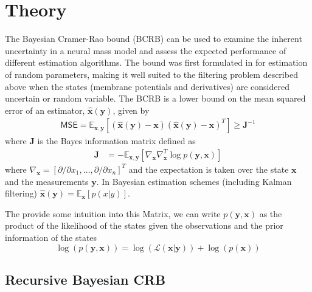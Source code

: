 \documentclass{article}
\renewcommand{\vec}[1]{\ensuremath{{\boldsymbol #1}}}
\newcommand{\mat}[1]{\ensuremath{\boldsymbol{#1}}}
\begin{document}
\section{Theory}

The Bayesian Cramer-Rao bound (BCRB) can be used to examine the inherent uncertainty in a neural mass model and assess the expected performance of different estimation algorithms. The bound was first formulated in \cite{VanTrees1968} for estimation of random parameters, making it well suited to the filtering problem described above when the states (membrane potentials and derivatives) are considered uncertain or random variable. The BCRB is a lower bound on the mean squared error of an estimator, $\hat{\vec x}(\vec y)$, given by
\begin{align}
	\mathsf{MSE} = \mathbb E_{\vec x,\vec y} [(\hat{\vec x}(\vec y) - \vec x)(\hat{\vec x}(\vec y) - \vec x)^T] \ge \mat J^{-1}
	\label{eqn:mse_bound}
\end{align}
where $\mat J$ is the Bayes information matrix defined as
\begin{align}
	\mat J &= -\mathbb E_{\vec x,\vec y}\left[ \nabla_{\vec x}\nabla_{\vec x}^T \log p(\vec y,\vec x) \right] 
	\label{eqn:bayes_matrix}
\end{align}
where $\nabla_{\vec x} = [\partial/\partial x_1,\ldots,\partial/\partial x_n]^T$ and the expectation is taken over the state $\vec x$ and the measurements $\vec y$. In Bayesian estimation schemes (including Kalman filtering) $\hat{\vec x}(\vec y) = \mathbb{E}_{\vec x}\left[p\left(x|y\right)\right]$. 

The provide some intuition into this Matrix, we can write $p(\vec y,\vec x)$ as the product of the likelihood of the states given the observations and the prior information of the states
\begin{equation}
	\log(p(\vec y,\vec x)) = \log\left(\mathcal{L}(\vec x|\vec y)\right) + \log\left(p(\vec x)\right)
\end{equation}


\subsection{Recursive Bayesian CRB}
\end{document}
